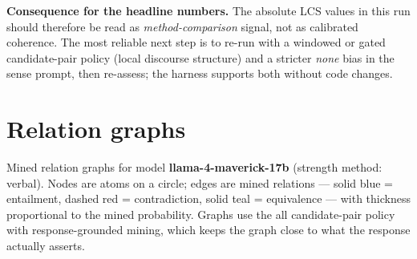 \documentclass[11pt]{article}
\begin{document}
\textbf{Consequence for the headline numbers.} The absolute LCS values in this run should therefore be read as \emph{method-comparison} signal, not as calibrated coherence. The most reliable next step is to re-run with a windowed or gated candidate-pair policy (local discourse structure) and a stricter \emph{none} bias in the sense prompt, then re-assess; the harness supports both without code changes.

\section{Relation graphs}\label{sec:graphs}

Mined relation graphs for model \textbf{llama-4-maverick-17b} (strength method: verbal). Nodes are atoms on a circle; edges are mined relations --- solid blue = entailment, dashed red = contradiction, solid teal = equivalence --- with thickness proportional to the mined probability. Graphs use the all candidate-pair policy with response-grounded mining, which keeps the graph close to what the response actually asserts.
\end{document}
